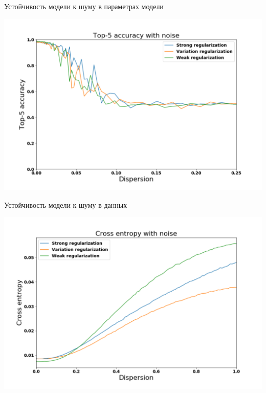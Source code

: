 \documentclass[10pt]{beamer}
\begin{document}
\begin{frame}{Устойчивость модели к шуму в параметрах модели}

\centering
\includegraphics[width=1\linewidth]{slides_t5_noise_params_graph.pdf}
\caption{}
\label{}

\end{frame}

\begin{frame}{Устойчивость модели к шуму в данных}

\centering
\includegraphics[width=1\linewidth]{slides_ce_noise_graph.pdf}
\caption{}
\label{}

\end{frame}
\end{document}
